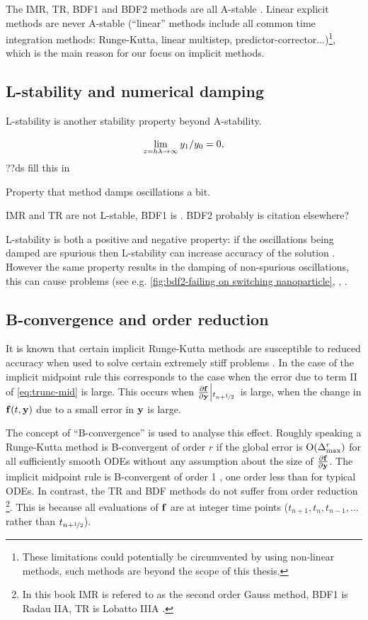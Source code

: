 The IMR, TR, BDF1 and BDF2 methods are all A-stable \cite[pgs. 43, 251]{HairerWanner}.
Linear explicit methods are never A-stable \cite{Nevanlinna1974} (``linear'' methods include all common time integration methods: Runge-Kutta, linear multistep, predictor-corrector...)\footnote{These limitations could potentially be circumvented by using non-linear methods, such methods are beyond the scope of this thesis.}, which is the main reason for our focus on implicit methods.


\subsection{L-stability and numerical damping}
\label{sec:imr-l-stability}

L-stability is another stability property beyond A-stability.


\begin{equation}
  \lim_{z=h\lambda \rightarrow \infty} y_1/y_0 = 0,
\end{equation}
??ds fill this in

Property that method damps oscillations a bit.

IMR and TR are not L-stable, BDF1 is \cite[45]{HairerWanner}. BDF2 probably is citation elsewhere?

L-stability is both a positive and negative property: if the oscillations being damped are spurious then L-stability can increase accuracy of the solution \cite[45]{HairerWanner}.
However the same property results in the damping of non-spurious oscillations, this can cause problems (see e.g. \autoref{fig:bdf2-failing on switching nanoparticle}, \cite[242]{GreshoSani}, \cite{Elman2011}.


\subsection{B-convergence and order reduction}
\label{sec:order-reduction}

It is known that certain implicit Runge-Kutta methods are susceptible to reduced accuracy when used to solve certain extremely stiff problems \cite[156]{Atkinson1994}\cite[225]{HairerWanner}.
In the case of the implicit midpoint rule this corresponds to the case when the error due to term II of \eqref{eq:trunc-mid} is large. This occurs when $\frac{\partial {\mathbf{f}}}{\partial \mathbf{y}}{\left|_{t_{n+\nicefrac{1}{2}}{}}\right.}$ is large, \ie when the change in ${\mathbf{f}{\left( t, \mathbf{y} \right)}}$ due to a small error in $\mathbf{y}$ is large.

The concept of ``B-convergence'' is used to analyse this effect.
Roughly speaking a Runge-Kutta method is B-convergent of order $r$ if the global error is  $\text{O}(\Delta_{\text{max}}^r)$ for all sufficiently smooth ODEs without any assumption about the size of $\frac{\partial {\mathbf{f}}}{\partial \mathbf{y}}$.
The implicit midpoint rule is B-convergent of order 1 \cite[231]{HairerWanner}, one order less than for typical ODEs.
In contrast, the TR and BDF methods do not suffer from order reduction \cite[159]{Atkinson1994}\footnote{In this book IMR is refered to as the second order Gauss method, BDF1 is Radau IIA, TR is Lobatto IIIA \cite[72-76]{HairerWanner}.}.
This is because all evaluations of ${\mathbf{f}}$ are at integer time points (\ie $t_{n+1}, t_{n}, t_{n-1}, \ldots$ rather than $t_{n+\nicefrac{1}{2}}$).

